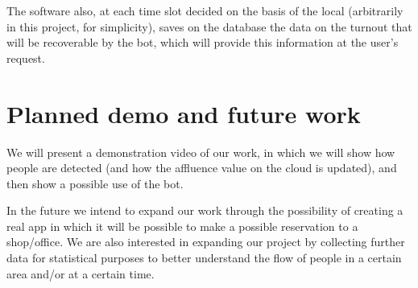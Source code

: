 
The software also, at each time slot decided on the basis of the local (arbitrarily in this project, for simplicity), saves on the database the data on the turnout that will be recoverable by the bot, which will provide this information at the user's request.


\section{Planned demo and future work}
We will present a demonstration video of our work, in which we will show how people are detected (and how the affluence value on the cloud is updated), and then show a possible use of the bot.


In the future we intend to expand our work through the possibility of creating a real app in which it will be possible to make a possible reservation to a shop/office.
We are also interested in expanding our project by collecting further data for statistical purposes to better understand the flow of people in a certain area and/or at a certain time.

